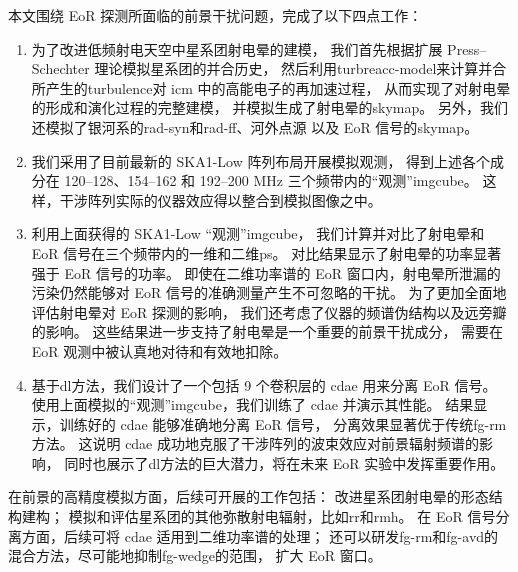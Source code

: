 
\begin{summary}

本文围绕 EoR 探测所面临的前景干扰问题，完成了以下四点工作：
\begin{enumerate}
\item
为了改进低频射电天空中星系团射电晕的建模，
我们首先根据扩展 Press--Schechter 理论模拟星系团的并合历史，
然后利用\ac{turbreacc-model}来计算并合所产生的\ac{turbulence}对 \ac{icm}
中的高能电子的再加速过程，
从而实现了对射电晕的形成和演化过程的完整建模，
并模拟生成了射电晕的\ac{skymap}。
另外，我们还模拟了银河系的\ac{rad-syn}和\ac{rad-ff}、河外点源
以及 EoR 信号的\ac{skymap}。

\item
我们采用了目前最新的 SKA1-Low 阵列布局开展模拟观测，
得到上述各个成分在 \numrange{120}{128}、\numrange{154}{162}
和 \numrange{192}{200} \si{\MHz} 三个频带内的\enquote{观测}\ac{imgcube}。
这样，干涉阵列实际的仪器效应得以整合到模拟图像之中。

\item
利用上面获得的 SKA1-Low \enquote{观测}\ac{imgcube}，
我们计算并对比了射电晕和 EoR 信号在三个频带内的一维和二维\ac{ps}。
对比结果显示了射电晕的功率显著强于 EoR 信号的功率。
即使在二维功率谱的 EoR 窗口内，射电晕所泄漏的污染仍然能够对
EoR 信号的准确测量产生不可忽略的干扰。
为了更加全面地评估射电晕对 EoR 探测的影响，
我们还考虑了仪器的频谱伪结构以及远旁瓣的影响。
这些结果进一步支持了射电晕是一个重要的前景干扰成分，
需要在 EoR 观测中被认真地对待和有效地扣除。

\item
基于\ac{dl}方法，我们设计了一个包括 9 个卷积层的 \ac{cdae} 用来分离 EoR 信号。
使用上面模拟的\enquote{观测}\ac{imgcube}，我们训练了 \ac{cdae} 并演示其性能。
结果显示，训练好的 \ac{cdae} 能够准确地分离 EoR 信号，
分离效果显著优于传统\ac{fg-rm}方法。
这说明 \ac{cdae} 成功地克服了干涉阵列的波束效应对前景辐射频谱的影响，
同时也展示了\ac{dl}方法的巨大潜力，将在未来 EoR 实验中发挥重要作用。
\end{enumerate}

在前景的高精度模拟方面，后续可开展的工作包括：
改进星系团射电晕的形态结构建构；
模拟和评估星系团的其他弥散射电辐射，比如\ac{rr}和\ac{rmh}。
在 EoR 信号分离方面，后续可将 \ac{cdae} 适用到二维功率谱的处理；
还可以研发\ac{fg-rm}和\ac{fg-avd}的混合方法，尽可能地抑制\ac{fg-wedge}的范围，
扩大 EoR 窗口。

\end{summary}
